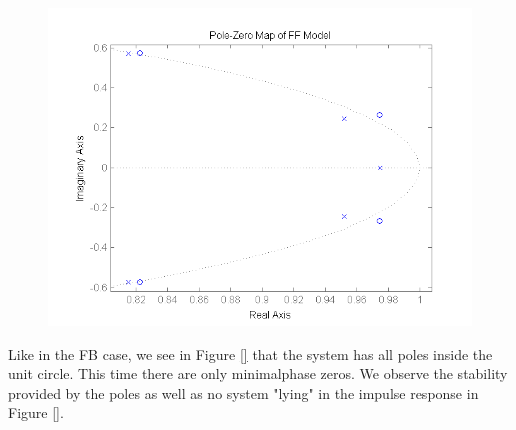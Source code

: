 \begin{figure}[H]
\centering
\includegraphics[width=1.0\textwidth]{pics/pole_FF}
\caption{}
\label{pic:}
\end{figure}

Like in the FB case, we see in Figure \ref{} that the system has all poles inside the unit circle. This time there are only minimalphase zeros. We observe the stability provided by the poles as well as no system "lying" in the impulse response in Figure \ref{}. 

